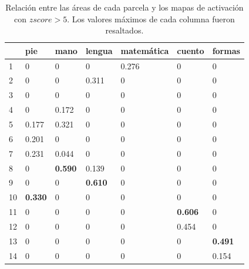 \begin{table}[]
\centering
\begin{tabular}{|l|l|l|l|l|l|l|}
\hline
   & pie   & mano  & lengua & matemática & cuento & formas \\ \hline
1  & 0     & 0     & 0      & 0.276      & 0      & 0      \\ \hline
2  & 0     & 0     & 0.311  & 0          & 0      & 0      \\ \hline
3  & 0     & 0     & 0      & 0          & 0      & 0      \\ \hline
4  & 0     & 0.172 & 0      & 0          & 0      & 0      \\ \hline
5  & 0.177 & 0.321 & 0      & 0          & 0      & 0      \\ \hline
6  & 0.201 & 0     & 0      & 0          & 0      & 0      \\ \hline
7  & 0.231 & 0.044 & 0      & 0          & 0      & 0      \\ \hline
8  & 0     & {\bf 0.590} & 0.139  & 0          & 0      & 0      \\ \hline
9  & 0     & 0     & {\bf 0.610}   & 0          & 0      & 0      \\ \hline
10 & {\bf 0.330}  & 0     & 0      & 0          & 0      & 0      \\ \hline
11 & 0     & 0     & 0      & 0          & {\bf 0.606}  & 0      \\ \hline
12 & 0     & 0     & 0      & 0          & 0.454  & 0      \\ \hline
13 & 0     & 0     & 0      & 0          & 0      & {\bf 0.491}  \\ \hline
14 & 0     & 0     & 0      & 0          & 0      & 0.154  \\ \hline
\end{tabular}
\caption{Relaci\'on entre las \'areas de cada parcela y los mapas de
         activaci\'on con $zscore > 5$. Los valores m\'aximos de cada 
         columna fueron resaltados.}
\label{tb:zscore5}         
\end{table}


